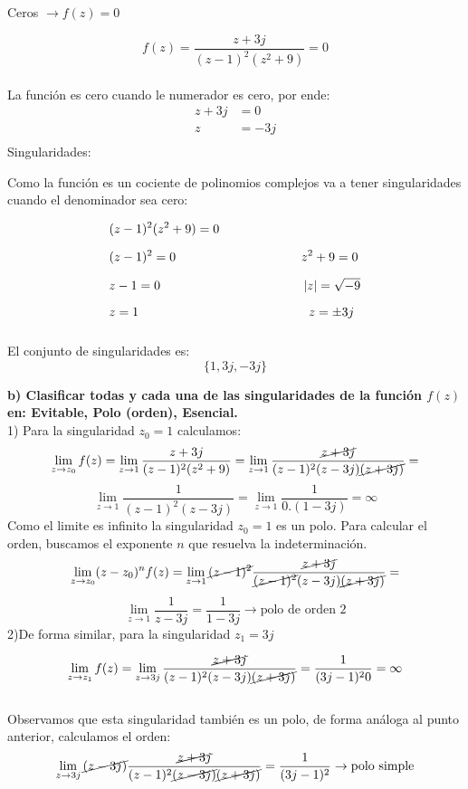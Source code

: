 \documentclass[12pt,a4paper]{report}
\begin{document}
Ceros $\rightarrow f(z)=0$

$$f(z)=\frac{z + 3j}{(z - 1)^2(z^2 + 9)}=0$$\\
La función es cero cuando le numerador es cero, por ende:
\begin{align*}
z+3j&=0\\[6pt]
z&=-3j\\[6pt]
\end{align*}
Singularidades:

Como la función es un cociente de polinomios complejos va a tener singularidades cuando el denominador sea cero:

\begin{align*}
    &(z-1)^2(z^2+9)=0\\[6pt]
    &(z-1)^2=0 \hspace{3.5cm}    z^2+9=0\\[6pt]
    &z-1=0     \hspace{4cm}   |z|=\sqrt{-9}\\[6pt]
    &z=1       \hspace{4.75cm}  z=\pm3j\\[6pt]
\end{align*}

El conjunto de singularidades es: $$\{1,3j,-3j\}$$

\textbf{b) Clasificar todas y cada una de las singularidades de la función $f(z)$ en: Evitable, Polo (orden), Esencial.}\\[6pt]
1) Para la singularidad $z_0=1$ calculamos:
$$\lim_{z \to z_0}f(z)=\lim_{z \to 1}\frac{z+3j}{(z - 1)^2(z^2 + 9)}=\lim_{z \to 1}\frac{\cancel{z+3j}}{(z - 1)^2(z-3j)\cancel{(z+3j)}}=$$
$$\lim_{z \to 1}\frac{1}{(z - 1)^2(z-3j)}=\lim_{z \to 1}\frac{1}{0.(1-3j)}=\infty$$
Como el limite es infinito la singularidad $z_0=1$ es un polo. Para calcular el orden, buscamos el exponente $n$ que resuelva
la indeterminación.\\
$$\lim_{z \to z_0}(z-z_0)^n f(z)=\lim_{z \to 1}\cancel{(z - 1)^2}\frac{\cancel{z+3j}}{\cancel{(z - 1)^2}(z-3j)\cancel{(z+3j)}}=$$
$$\lim_{z \to 1}\frac{1}{z-3j}=\frac{1}{1-3j}\rightarrow \text{polo de orden 2}$$
2)De forma similar, para la singularidad $z_1=3j$

$$\lim_{z \to z_1}f(z)=\lim_{z \to 3j}\frac{\cancel{z+3j}}{(z - 1)^2(z-3j)\cancel{(z+3j)}}=\frac{1}{(3j-1)^20}=\infty$$\\
Observamos que esta singularidad también es un polo, de forma análoga al punto anterior, calculamos el orden:
$$\lim_{z \to 3j}\cancel{(z - 3j)}\frac{\cancel{z+3j}}{(z - 1)^2\cancel{(z-3j)}\cancel{(z+3j)}}
=\frac{1}{(3j-1)^2}\rightarrow \text{polo simple}$$\\
\end{document}
